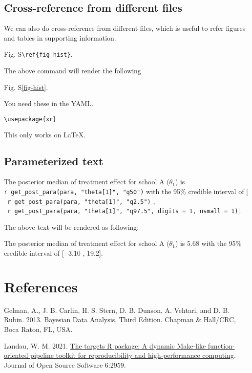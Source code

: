\documentclass[
  12pt,
  letterpaper,
  DIV=11,
  numbers=noendperiod]{scrartcl}
\newlength{\cslhangindent}
\newlength{\cslentryspacingunit} %
\newenvironment{CSLReferences}[2] %
 {%
  \setlength{\parindent}{0pt}
  \ifodd #1
  \let\oldpar\par
  \def\par{\hangindent=\cslhangindent\oldpar}
  \fi
  \setlength{\parskip}{#2\cslentryspacingunit}
 }%
 {}
\begin{document}
\hypertarget{cross-reference-from-different-files}{%
\subsection{Cross-reference from different
files}\label{cross-reference-from-different-files}}

We can also do cross-reference from different files, which is useful to
refer figures and tables in supporting information.

Fig. S\texttt{\textbackslash{}ref\{fig-hist\}}.

The above command will render the following

Fig. S\ref{fig-hist}.

You need these in the YAML.

\begin{verbatim}
\usepackage{xr}

\end{verbatim}

This only works on LaTeX.

\hypertarget{parameterized-text}{%
\subsection{Parameterized text}\label{parameterized-text}}

The posterior median of treatment effect for school A (\(\theta_1\)) is
\texttt{\textasciigrave{}r\ get\_post\_para(para,\ "theta{[}1{]}",\ "q50")\textasciigrave{}}
with the 95\% credible interval of {[}
\texttt{\textasciigrave{}\ r\ get\_post\_para(para,\ "theta{[}1{]}",\ "q2.5")\textasciigrave{}}
,
\texttt{\textasciigrave{}\ r\ get\_post\_para(para,\ "theta{[}1{]}",\ "q97.5",\ digits\ =\ 1,\ nsmall\ =\ 1)\textasciigrave{}}{]}.

The above text will be rendered as following:

The posterior median of treatment effect for school A (\(\theta_1\)) is
5.68 with the 95\% credible interval of {[} -3.10 , 19.2{]}.

\hypertarget{references}{%
\section{References}\label{references}}

\hypertarget{refs}{}
\begin{CSLReferences}{1}{0}
\leavevmode{}%
Gelman, A., J. B. Carlin, H. S. Stern, D. B. Dunson, A. Vehtari, and D.
B. Rubin. 2013. Bayesian {Data Analysis}, {Third Edition}. {Chapman \&
Hall/CRC}, {Boca Raton, FL, USA.}

\leavevmode{}%
Landau, W. M. 2021. \href{https://doi.org/10.21105/joss.02959}{The
targets {R} package: A dynamic {Make-like} function-oriented pipeline
toolkit for reproducibility and high-performance computing}. Journal of
Open Source Software 6:2959.

\end{CSLReferences}
\end{document}
